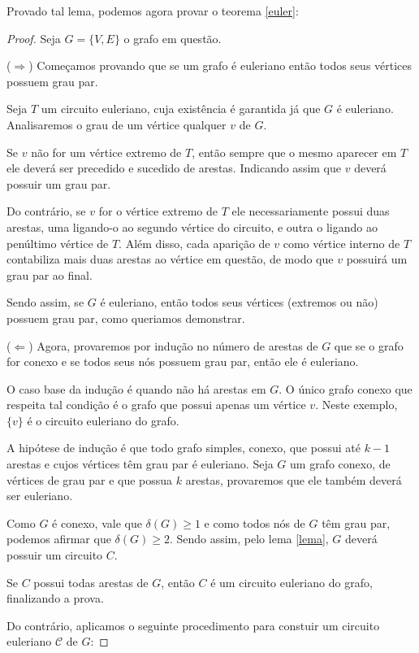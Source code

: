\documentclass{article}
\begin{document}
Provado tal lema, podemos agora provar o teorema \ref{euler}:

\begin{proof}

Seja $G = \{V, E\}$ o grafo em questão.

($\Rightarrow$) Começamos provando que se um grafo é euleriano então todos seus vértices possuem grau par.

Seja $T$ um circuito euleriano, cuja existência é garantida já que $G$ é euleriano. Analisaremos o grau de um vértice qualquer $v$ de $G$.

Se $v$ não for um vértice extremo de $T$, então sempre que o mesmo aparecer em $T$ ele deverá ser precedido e sucedido de arestas. Indicando assim que $v$ deverá possuir um grau par.

Do contrário, se $v$ for o vértice extremo de $T$ ele necessariamente possui duas arestas, uma ligando-o ao segundo vértice do circuito, e outra o ligando ao penúltimo vértice de $T$. 
Além disso, cada aparição de $v$ como vértice interno de $T$ contabiliza mais duas arestas ao vértice em questão, de modo que $v$ possuirá um grau par ao final.

Sendo assim, se $G$ é euleriano, então todos seus vértices (extremos ou não) possuem grau par, como queriamos demonstrar.\newline

($\Leftarrow$) Agora, provaremos por indução no número de arestas de $G$ que se o grafo for conexo e se todos seus nós possuem grau par, então ele é euleriano.

O caso base da indução é quando não há arestas em $G$. 
O único grafo conexo que respeita tal condição é o grafo que possui apenas um vértice $v$.
Neste exemplo, $\{v\}$ é o circuito euleriano do grafo.

A hipótese de indução é que todo grafo simples, conexo, que possui até $k-1$ arestas e cujos vértices têm grau par é euleriano. 
Seja $G$ um grafo conexo, de vértices de grau par e que possua $k$ arestas, provaremos que ele também deverá ser euleriano.

Como $G$ é conexo, vale que $\delta(G) \geq 1$ e como todos nós de $G$ têm grau par, podemos afirmar que $\delta(G) \geq 2$. 
Sendo assim, pelo lema \ref{lema}, $G$ deverá possuir um circuito $C$.

Se $C$ possui todas arestas de $G$, então $C$ é um circuito euleriano do grafo, finalizando a prova.

Do contrário, aplicamos o seguinte procedimento para constuir um circuito euleriano $\mathcal{C}$ de $G$:


\end{proof}
\end{document}
